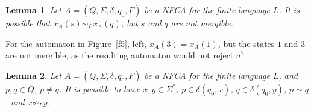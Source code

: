 \documentclass[submission,copyright,creativecommons]{eptcs}
\newtheorem{lemma}{Lemma}
\newenvironment{proof}[1][Proof]{\begin{trivlist}
\item[\hskip \labelsep {\bfseries #1}]}{\end{trivlist}}
\begin{document}
\begin{lemma}
 Let $A=(Q,\Sigma,\delta,q_0,F)$ be a NFCA for the finite language $L$.
It is possible that $x_A(s)\sim_L x_A(q)$, but $s$ and $q$ are not mergible.
\end{lemma}
\begin{proof}
 For the automaton in Figure~\ref{f5}, left, $x_A(3)=x_A(1)$, but the states $1$ and $3$ are not mergible,
as the resulting automaton would not reject $a^7$.
\end{proof}


\begin{lemma}
 Let $A=(Q,\Sigma,\delta,q_0,F)$ be a NFCA for the finite language $L$, and $p,q\in Q$, $p\neq q$.
It is possible to have $x,y\in \Sigma^*$, $p\in \delta(q_0,x)$, $q\in \delta(q_0,y)$,
 $p \sim q$, and  $x\not\sim_L y$.
\end{lemma}
\end{document}
